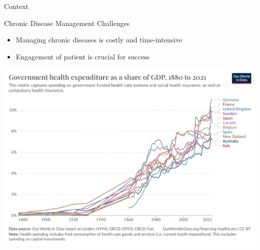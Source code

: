 \documentclass[handout]{beamer}\mode<handout>{\usetheme{AMSBolognaFC}}
\begin{document}
\begin{frame}[c]{Context}
    
    Chronic Disease Management Challenges
    \vfill
    \begin{itemize}
        \item Managing chronic diseases is \alert{costly} and \alert{time-intensive}
        \item Engagement of patient is crucial for success
    \end{itemize}
    \vfill
    \centering
    \includegraphics[width=.6\textwidth]{figures/public-health-expenditure-share-gdp}
    \vfill

\end{frame}
\end{document}
